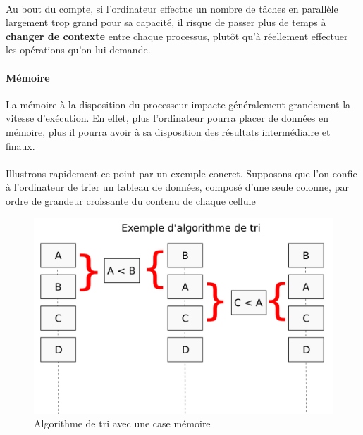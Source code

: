 {  \paragraph{} Au bout du compte, si l'ordinateur effectue un nombre de tâches en parallèle
  largement trop grand pour sa capacité, il risque de passer plus de temps à \textbf{changer de
  contexte} entre chaque processus, plutôt qu'à réellement effectuer les opérations qu'on lui
  demande.

  \paragraph{Mémoire} La mémoire à la disposition du processeur impacte généralement grandement la
  vitesse d'exécution. En effet, plus l'ordinateur pourra placer de données en mémoire, plus il
  pourra avoir à sa disposition des résultats intermédiaire et finaux.

  \paragraph{} Illustrons rapidement ce point par un exemple concret. Supposons que l'on confie à
  l'ordinateur de trier un tableau de données, composé d'une seule colonne, par ordre de grandeur
  croissante du contenu de chaque cellule

  \begin{figure}[h]
    \begin{center}
      \includegraphics[scale=0.3]{img/exemple-algo.png}
      \caption{Algorithme de tri avec une case mémoire}
      \label{algo-exemple}
    \end{center}
  \end{figure}

}

